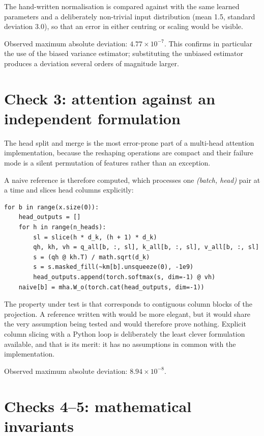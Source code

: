 The hand-written normalisation is compared against  with the same learned
parameters and a deliberately non-trivial input distribution (mean 1.5, standard deviation 3.0), so
that an error in either centring or scaling would be visible.

Observed maximum absolute deviation: $4.77\times10^{-7}$. This confirms in particular the use of
the biased variance estimator; substituting the unbiased estimator produces a deviation several
orders of magnitude larger.

\section{Check 3: attention against an independent formulation}

The head split and merge is the most error-prone part of a multi-head attention implementation,
because the reshaping operations are compact and their failure mode is a silent permutation of
features rather than an exception.

A naive reference is therefore computed, which processes one \emph{(batch, head)} pair at a time
and slices head columns explicitly:

{\small
\begin{verbatim}
for b in range(x.size(0)):
    head_outputs = []
    for h in range(n_heads):
        sl = slice(h * d_k, (h + 1) * d_k)
        qh, kh, vh = q_all[b, :, sl], k_all[b, :, sl], v_all[b, :, sl]
        s = (qh @ kh.T) / math.sqrt(d_k)
        s = s.masked_fill(~km[b].unsqueeze(0), -1e9)
        head_outputs.append(torch.softmax(s, dim=-1) @ vh)
    naive[b] = mha.W_o(torch.cat(head_outputs, dim=-1))
\end{verbatim}}

 The property under test is that
 corresponds to contiguous column blocks of the projection.
A reference written with  would be more elegant, but it would share the very
assumption being tested and would therefore prove nothing. Explicit column slicing with a Python
loop is deliberately the least clever formulation available, and that is its merit: it has no
assumptions in common with the implementation.

Observed maximum absolute deviation: $8.94\times10^{-8}$.

\section{Checks 4--5: mathematical invariants}

